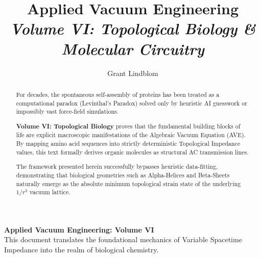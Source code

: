 \title{\textbf{Applied Vacuum Engineering} \\ \large \textit{Volume VI: Topological Biology \& Molecular Circuitry}}
\author{Grant Lindblom}
\date{}

\maketitle

\vfill
\noindent\textbf{Applied Vacuum Engineering: Volume VI} \\
This document translates the foundational mechanics of Variable Spacetime Impedance into the realm of biological chemistry.

\begin{abstract}
    For decades, the spontaneous self-assembly of proteins has been treated as a computational paradox (Levinthal's Paradox) solved only by heuristic AI guesswork or impossibly vast force-field simulations. 

    \textbf{Volume VI: Topological Biology} proves that the fundamental building blocks of life are explicit macroscopic manifestations of the Algebraic Vacuum Equation (AVE). By mapping amino acid sequences into strictly deterministic Topological Impedance values, this text formally derives organic molecules as structural AC transmission lines. 

    The framework presented herein successfully bypasses heuristic data-fitting, demonstrating that biological geometries such as Alpha-Helices and Beta-Sheets naturally emerge as the absolute minimum topological strain state of the underlying $1/r^3$ vacuum lattice.
\end{abstract}
